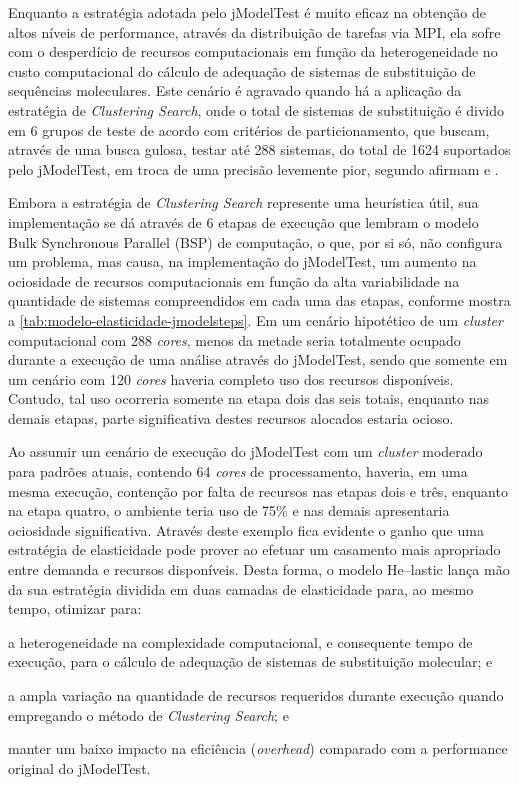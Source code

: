 \documentclass[english,brazilian]{UNISINOSmonografia} %
\begin{document}
Enquanto a estratégia adotada pelo jModelTest é muito eficaz na obtenção de altos níveis de performance, através da distribuição de tarefas via MPI, ela sofre com o desperdício de recursos computacionais em função da heterogeneidade no custo computacional do cálculo de adequação de sistemas de substituição de sequências moleculares.
Este cenário é agravado quando há a aplicação da estratégia de \textit{Clustering Search}, onde o total de sistemas de substituição é divido em 6 grupos de teste de acordo com critérios de particionamento, que buscam, através de uma busca gulosa, testar até 288 sistemas, do total de 1624 suportados pelo jModelTest, em troca de uma precisão levemente pior, segundo afirmam  e .



Embora a estratégia de \textit{Clustering Search} represente uma heurística útil, sua implementação se dá através de 6 etapas de execução que lembram o modelo Bulk Synchronous Parallel (BSP) de computação, o que, por si só, não configura um problema, mas causa, na implementação do jModelTest, um aumento na ociosidade de recursos computacionais em função da alta variabilidade na quantidade de sistemas compreendidos em cada uma das etapas, conforme mostra a \autoref{tab:modelo-elasticidade-jmodelsteps}.
Em um cenário hipotético de um \textit{cluster} computacional com 288 \textit{cores}, menos da metade seria totalmente ocupado durante a execução de uma análise através do jModelTest, sendo que somente em um cenário com 120 \textit{cores} haveria completo uso dos recursos disponíveis.
Contudo, tal uso ocorreria somente na etapa dois das seis totais, enquanto nas demais etapas, parte significativa destes recursos alocados estaria ocioso.



Ao assumir um cenário de execução do jModelTest com um \textit{cluster} moderado para padrões atuais, contendo 64 \textit{cores} de processamento, haveria, em uma mesma execução, contenção por falta de recursos nas etapas dois e três, enquanto na etapa quatro, o ambiente teria uso de 75\% e nas demais apresentaria ociosidade significativa.
Através deste exemplo fica evidente o ganho que uma estratégia de elasticidade pode prover ao efetuar um casamento mais apropriado entre demanda e recursos disponíveis.
Desta forma, o modelo \textsf{He}--lastic lança mão da sua estratégia dividida em duas camadas de elasticidade para, ao mesmo tempo, otimizar para:
\begin{inparaenum} 
	\item a heterogeneidade na complexidade computacional, e consequente tempo de execução, para o cálculo de adequação de sistemas de substituição molecular; e
	\item a ampla variação na quantidade de recursos requeridos durante execução quando empregando o método de \textit{Clustering Search}; e
	\item manter um baixo impacto na eficiência (\textit{overhead}) comparado com a performance original do jModelTest. 
\end{inparaenum}
\end{document}
